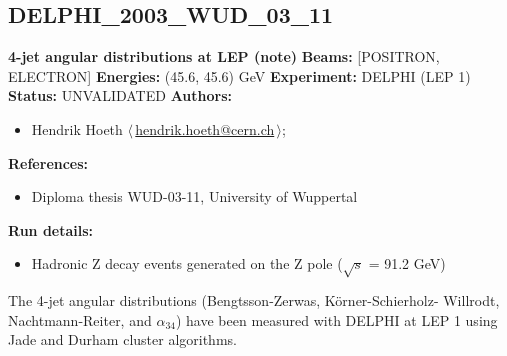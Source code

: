 \subsection{DELPHI\_2003\_WUD\_03\_11}
\textbf{4-jet angular distributions at LEP (note)}\newline
\textbf{Beams:} [POSITRON, ELECTRON] \newline
\textbf{Energies:} (45.6, 45.6) GeV \newline
\textbf{Experiment:} DELPHI (LEP 1) \newline
\textbf{Status:} UNVALIDATED\newline
\textbf{Authors:}
\begin{itemize}
  \item Hendrik Hoeth $\langle\,$\href{mailto:hendrik.hoeth@cern.ch}{hendrik.hoeth@cern.ch}$\,\rangle$;
\end{itemize}
\textbf{References:}
\begin{itemize}
  \item Diploma thesis WUD-03-11, University of Wuppertal
\end{itemize}
\textbf{Run details:}
\begin{itemize}

  \item Hadronic Z decay events generated on the Z pole (\ensuremath{\sqrt{s}} = 91.2 GeV)\end{itemize}

\noindent The 4-jet angular distributions (Bengtsson-Zerwas, K\"orner-Schierholz- Willrodt, Nachtmann-Reiter, and $\alpha_{34}$) have been measured with DELPHI at LEP 1 using Jade and Durham cluster algorithms.

\clearpage


\clearpage

